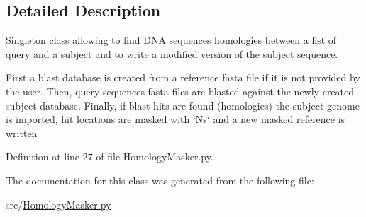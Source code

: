 \subsection{Detailed Description}
Singleton class allowing to find D\-N\-A sequences homologies between a list of query and a subject and to write a modified version of the subject sequence. 

First a blast database is created from a reference fasta file if it is not provided by the user. Then, query sequences fasta files are blasted against the newly created subject database. Finally, if blast hits are found (homologies) the subject genome is imported, hit locations are masked with \char`\"{}\-Ns\char`\"{} and a new masked reference is written 

Definition at line 27 of file Homology\-Masker.\-py.



The documentation for this class was generated from the following file\-:\begin{DoxyCompactItemize}
\item 
src/\hyperlink{HomologyMasker_8py}{Homology\-Masker.\-py}\end{DoxyCompactItemize}
